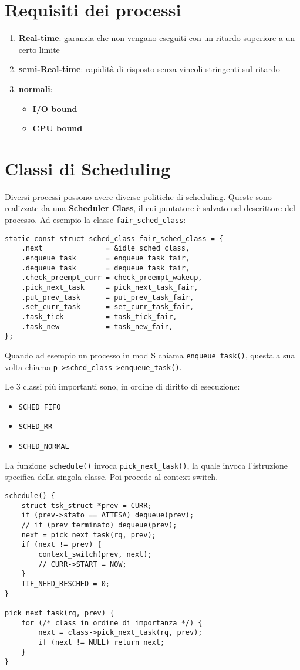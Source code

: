 \documentclass[12pt, a4paper]{report}
\begin{document}
\section{Requisiti dei processi}
\begin{enumerate}
	\item \textbf{Real-time}: garanzia che non vengano eseguiti con un ritardo
		superiore a un certo limite
	\item \textbf{semi-Real-time}: rapidità di risposto senza vincoli
		stringenti sul ritardo
	\item \textbf{normali}:
		\begin{itemize}
			\item \textbf{I/O bound}
			\item \textbf{CPU bound}
		\end{itemize}
\end{enumerate}

\section{Classi di Scheduling}
Diversi processi possono avere diverse politiche di scheduling. Queste sono
realizzate da una \textbf{Scheduler Class}, il cui puntatore è salvato nel
descrittore del processo. Ad esempio la classe \texttt{fair\_sched\_class}:
\begin{verbatim}
static const struct sched_class fair_sched_class = {
    .next               = &idle_sched_class,
    .enqueue_task       = enqueue_task_fair,
    .dequeue_task       = dequeue_task_fair,
    .check_preempt_curr = check_preempt_wakeup,
    .pick_next_task     = pick_next_task_fair,
    .put_prev_task      = put_prev_task_fair,
    .set_curr_task      = set_curr_task_fair,
    .task_tick          = task_tick_fair,
    .task_new           = task_new_fair,
};
\end{verbatim}
Quando ad esempio un processo in mod S chiama \texttt{enqueue\_task()}, questa a
sua volta chiama \texttt{p->sched\_class->enqueue\_task()}.

Le 3 classi più importanti sono, in ordine di diritto di esecuzione:
\begin{itemize}
	\item \texttt{SCHED\_FIFO}
	\item \texttt{SCHED\_RR}
	\item \texttt{SCHED\_NORMAL}
\end{itemize}
La funzione \texttt{schedule()} invoca \texttt{pick\_next\_task()}, la quale
invoca l'istruzione specifica della singola classe. Poi procede al context
switch.
\begin{verbatim}
schedule() {
	struct tsk_struct *prev = CURR;
	if (prev->stato == ATTESA) dequeue(prev);
	// if (prev terminato) dequeue(prev);
	next = pick_next_task(rq, prev);
	if (next != prev) {
		context_switch(prev, next);
		// CURR->START = NOW;
	}
	TIF_NEED_RESCHED = 0;
}

pick_next_task(rq, prev) {
	for (/* class in ordine di importanza */) {
		next = class->pick_next_task(rq, prev);
		if (next != NULL) return next;
	}
}
\end{verbatim}
\end{document}
